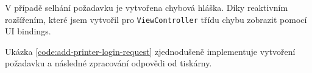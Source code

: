 V případě selhání požadavku je vytvořena chybová hláška.
Díky reaktivním rozšířením, které jsem vytvořil pro \texttt{ViewController} třídu chybu zobrazit pomocí UI bindings.

Ukázka \ref{code:add-printer-login-request} zjednodušeně implementuje vytvoření požadavku a následné zpracování odpovědi od tiskárny.



